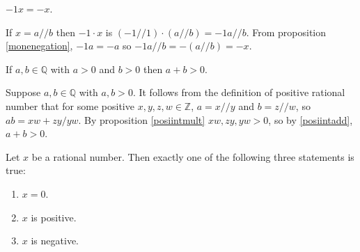 \documentclass{article}
\begin{document}
\begin{proposition}
	\label{ronenegation}
	\(-1x=-x\).
	\begin{IEEEproof}
		If \(x=a//b\) then \(-1\cdot x\) is \((-1//1)\cdot(a//b)=-1a//b\). From proposition \ref{monenegation}, \(-1a=-a\) so \(-1a//b=-(a//b)=-x\).
	\end{IEEEproof}
\end{proposition}
\begin{proposition}
	\label{posiratadd}
	If \(a,b\in\mathbb{Q}\) with \(a>0\) and \(b>0\) then \(a+b>0\).
	\begin{IEEEproof}
		Suppose \(a,b\in\mathbb{Q}\) with \(a,b>0\). It follows from the definition of positive rational number that for some positive \(x,y,z,w\in\mathbb{Z}\), \(a=x//y\) and \(b=z//w\), so \(ab=xw+zy/yw\). By proposition \ref{posiintmult} \(xw,zy,yw>0\), so by \ref{posiintadd}, \(a+b>0\).
	\end{IEEEproof}
\end{proposition}
\begin{lemma}
	Let \(x\) be a rational number. Then exactly one of the following three statements is true:
	\begin{enumerate}
		\item \(x=0\).
		\item \(x\) is positive.
		\item \(x\) is negative.
	\end{enumerate}
\end{lemma}
\end{document}
